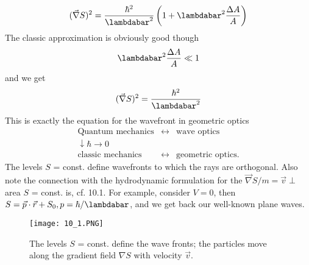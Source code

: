 \begin{equation}
    (\vec{\nabla} S)^{2}=\frac{\hbar^{2}}{\lambdabar^{2}}\left(1+\lambdabar^{2} \frac{\Delta A}{A}\right)
    \end{equation}
The classic approximation is obviously good though
%
\begin{equation}
    \lambdabar^{2} \frac{\Delta A}{A} \ll 1
    \end{equation}
and we get
\begin{equation}
    (\vec{\nabla} S)^{2}=\frac{\hbar^{2}}{\lambdabar^{2}}
    \end{equation}
This is exactly the equation for the wavefront in geometric optics
\begin{equation}
    \begin{array}{ccc}
        \text{Quantum mechanics} & \leftrightarrow & \text{wave optics}\\
        \downarrow \hbar\rightarrow 0 & &\\
        \text{classic mechanics} & \leftrightarrow & \text{geometric optics}.\nonumber
    \end{array}
\end{equation}
The levels $S$ = const. define wavefronts to which the rays are orthogonal. Also note the connection with the hydrodynamic formulation for the $\vec{\nabla}S/m=\vec{v}\perp$ area $S$ = const. is, cf. 10.1. For example, consider $V = 0$, then $S=\vec{p}\cdot\vec{r}+S_0,p=\hbar/\lambdabar$, and we get back our well-known plane waves.
\begin{figure}[ht]
    \begin{minipage}{0.5\textwidth}
        \centering
        \texttt{[image: 10\_1.PNG]}
    \end{minipage}
    \begin{minipage}{0.5\textwidth}
        \caption{The levels $S$ = const. define the wave fronts; the particles move along the gradient field $\nabla S$ with velocity $\vec{v}$.}
    \end{minipage}
\end{figure}

